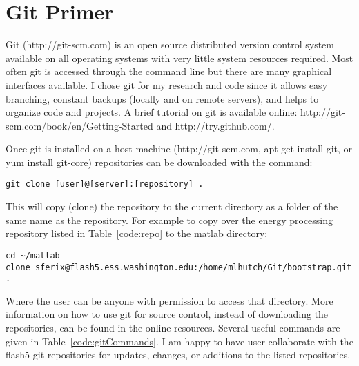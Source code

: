 \section{Git Primer}
\label{code:primer}

Git (http://git-scm.com) is an open source distributed version control system available on all operating systems with very little system resources required.
Most often git is accessed through the command line but there are many graphical interfaces available.
I chose git for my research and code since it allows easy branching, constant backups (locally and on remote servers), and helps to organize code and projects.
A brief tutorial on git is available online: http://git-scm.com/book/en/Getting-Started and http://try.github.com/.

Once git is installed on a host machine (http://git-scm.com, apt-get install git, or yum install git-core) repositories can be downloaded with the command:

\begin{verbatim}
git clone [user]@[server]:[repository] .
\end{verbatim}

This will copy (clone) the repository to the current directory as a folder of the same name as the repository. 
For example to copy over the energy processing repository listed in Table~\ref{code:repo} to the matlab directory:

\begin{verbatim}
cd ~/matlab
clone sferix@flash5.ess.washington.edu:/home/mlhutch/Git/bootstrap.git .
\end{verbatim}

Where the user can be anyone with permission to access that directory.
More information on how to use git for source control, instead of downloading the repositories, can be found in the online resources.
Several useful commands are given in Table~\ref{code:gitCommands}.
I am happy to have user collaborate with the flash5 git repositories for updates, changes, or additions to the listed repositories.

